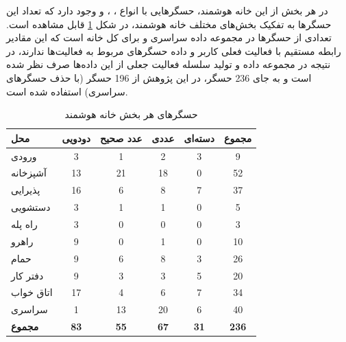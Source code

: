 در هر بخش از این خانه هوشمند، حسگرهایی با انواع ، ،  و  وجود دارد که تعداد این حسگرها به تفکیک بخش‌های مختلف خانه هوشمند، در شکل \ref{tab:tO4H1} قابل مشاهده است. تعدادی از حسگرها در مجموعه داده  سراسری و برای کل خانه است که این مقادیر رابطه مستقیم با فعالیت فعلی کاربر و داده حسگرهای مربوط به فعالیت‌ها ندارند، در نتیجه در مجموعه داده و تولید سلسله فعالیت جعلی از این داده‌ها صرف نظر شده است و به جای 236 حسگر، در این پژوهش از 196 حسگر (با حذف حسگرهای سراسری) استفاده شده است.

\begin{table} [htp]
 \centering
 \caption{حسگرهای هر بخش خانه هوشمند}
 \label{tab:tO4H1}
 \begin{adjustbox}{width=0.8\textwidth}
\begin{tabular}{|l|c|c|c|c|c|}
\hline
\textbf{محل} & \textbf{دودویی} & \textbf{عدد صحیح} & \textbf{عددی} & \textbf{دسته‌ای} & \textbf{مجموع} \\ \hline
ورودی       & 3               & 1                & 2                    & 3                    & 9             \\ \hline
آشپزخانه        & 13              & 21               & 18                   & 0                    & 52            \\ \hline
پذیرایی    & 16              & 6                & 8                    & 7                    & 37            \\ \hline
دستشویی         & 3               & 1                & 1                    & 0                    & 5             \\ \hline
راه پله      & 3               & 0                & 0                    & 0                    & 3             \\ \hline
راهرو        & 9               & 0                & 1                    & 0                    & 10            \\ \hline
حمام       & 9               & 6                & 8                    & 3                    & 26            \\ \hline
دفتر کار         & 9               & 3                & 3                    & 5                    & 20            \\ \hline
اتاق خواب        & 17              & 4                & 6                    & 7                    & 34            \\ \hline
سراسری         & 1               & 13               & 20                   & 6                    & 40            \\ \hline
\textbf{مجموع} & \textbf{83}     & \textbf{55}      & \textbf{67}          & \textbf{31}          & \textbf{236}  \\ \hline
\end{tabular}
\end{adjustbox}
\end{table}

